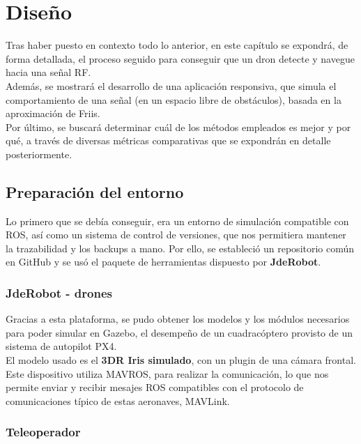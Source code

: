 \chapter{Diseño}
\label{cap:capitulo4}

Tras haber puesto en contexto todo lo anterior, en este capítulo se expondrá, de forma detallada, el proceso seguido para conseguir que un dron detecte y navegue hacia una señal \ac{RF}.\\

Además, se mostrará el desarrollo de una aplicación responsiva, que simula el comportamiento de una señal (en un espacio libre de obstáculos), basada en la aproximación de Friis.\\

Por último, se buscará determinar cuál de los métodos empleados es mejor y por qué, a través de diversas métricas comparativas que se expondrán en detalle posteriormente.\\

\section{Preparación del entorno}
\label{sec:preparacion_del_entorno}

Lo primero que se debía conseguir, era un entorno de simulación compatible con \ac{ROS}, así como un sistema de control de versiones, que nos permitiera mantener la trazabilidad y los backups a mano. Por ello, se estableció un repositorio común en GitHub y se usó el paquete de herramientas dispuesto por \textbf{JdeRobot}.

\subsection{JdeRobot - drones}
\label{subsec:jderobot_drones}

Gracias a esta plataforma, se pudo obtener los modelos y los módulos necesarios para poder simular en Gazebo, el desempeño de un cuadracóptero provisto de un sistema de autopilot PX4.\\

El modelo usado es el \textbf{3DR Iris simulado}, con un plugin de una cámara frontal. Este dispositivo utiliza MAVROS, para realizar la comunicación, lo que nos permite enviar y recibir mesajes ROS compatibles con el protocolo de comunicaciones típico de estas aeronaves, MAVLink.\\

\subsection{Teleoperador}
\label{subsec:teleoperador}

